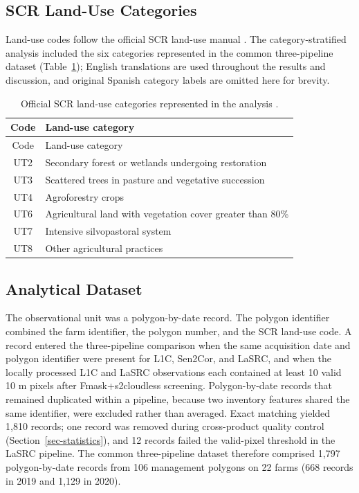 \documentclass[
  authoryear,
  preprint]{elsarticle}
\begin{document}
\subsection{SCR Land-Use Categories}\label{sec-ut}

Land-use codes follow the official SCR land-use manual
\citep{SCRLandUseManual2017}. The category-stratified analysis included
the six categories represented in the common three-pipeline dataset
(Table~\ref{tbl-ut}); English translations are used throughout the
results and discussion, and original Spanish category labels are omitted
here for brevity.

\begin{longtable}[]{@{}cl@{}}
\caption{Official SCR land-use categories represented in the analysis
\citep{SCRLandUseManual2017}.}\label{tbl-ut}\tabularnewline
\toprule\noalign{}
Code & Land-use category \\
\midrule\noalign{}
\endfirsthead
\toprule\noalign{}
Code & Land-use category \\
\midrule\noalign{}
\endhead
\bottomrule\noalign{}
\endlastfoot
UT2 & Secondary forest or wetlands undergoing restoration \\
UT3 & Scattered trees in pasture and vegetative succession \\
UT4 & Agroforestry crops \\
UT6 & Agricultural land with vegetation cover greater than 80\% \\
UT7 & Intensive silvopastoral system \\
UT8 & Other agricultural practices \\
\end{longtable}

\subsection{Analytical Dataset}\label{sec-inclusion}

The observational unit was a polygon-by-date record. The polygon
identifier combined the farm identifier, the polygon number, and the SCR
land-use code. A record entered the three-pipeline comparison when the
same acquisition date and polygon identifier were present for L1C,
Sen2Cor, and LaSRC, and when the locally processed L1C and LaSRC
observations each contained at least 10 valid 10 m pixels after
Fmask+s2cloudless screening. Polygon-by-date records that remained
duplicated within a pipeline, because two inventory features shared the
same identifier, were excluded rather than averaged. Exact matching
yielded 1,810 records; one record was removed during cross-product
quality control (Section~\ref{sec-statistics}), and 12 records failed
the valid-pixel threshold in the LaSRC pipeline. The common
three-pipeline dataset therefore comprised 1,797 polygon-by-date records
from 106 management polygons on 22 farms (668 records in 2019 and 1,129
in 2020).
\end{document}
